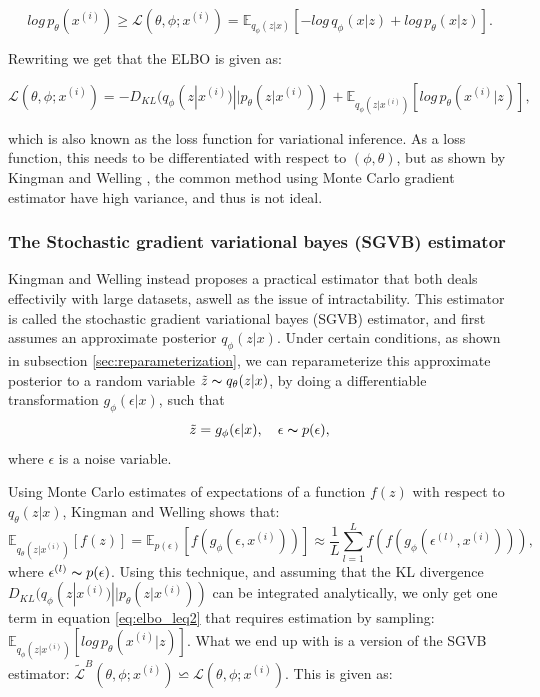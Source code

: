 \begin{equation}\label{eq:elbo_leq1}
    log\, p_{\theta}(x^{(i)}) \geq \mathcal{L}(\theta, \phi;x^{(i)}) = \mathbb{E}_{q_{\phi}(z|x)}[-log\, q_{\phi}(x|z)+log\, p_{\theta}(x|z)].
\end{equation}

Rewriting we get that the ELBO is given as:

\begin{equation}\label{eq:elbo_leq2}
    \mathcal{L}(\theta, \phi;x^{(i)}) =  - D_{KL}(q_{\phi}(z|x^{(i)})||p_{\theta}(z|x^{(i)})) + \mathbb{E}_{q_{\phi}(z|x^{(i)})}[log\, p_{\theta}(x^{(i)}|z)],
\end{equation}

which is also known as the loss function for variational inference. As a loss function, this needs to be differentiated with respect to 
$(\phi, \theta)$, but as shown by Kingman and Welling \cite{VAE}, the common method using Monte Carlo gradient estimator have high variance,
and thus is not ideal. 

\subsubsection*{The Stochastic gradient variational bayes (SGVB) estimator}
Kingman and Welling \cite{VAE} instead proposes a practical estimator that both deals effectivily with large datasets, aswell as the 
issue of intractability. This estimator is called the stochastic gradient variational bayes (SGVB) estimator, and first assumes an approximate 
posterior $q_{\phi}(z|x)$. Under certain conditions, as shown in subsection \ref{sec:reparameterization}, we can reparameterize this approximate
posterior to a random variable $\tilde{z} \thicksim q_{\theta}(z|x)$, by doing a differentiable transformation $g_{\phi}(\epsilon|x)$, such that 
\begin{equation*}
    \tilde{z} = g_{\phi}(\epsilon|x), \quad \epsilon \thicksim p(\epsilon),
\end{equation*}
where $\epsilon$ is a noise variable.\par 
Using Monte Carlo estimates of expectations of a function $f(z)$ with respect to $q_{\theta}(z|x)$, Kingman and Welling \cite{VAE} shows that:
\begin{equation}
    \mathbb{E}_{q_{\theta}(z|x^{(i)})}[f(z)] = \mathbb{E}_{p(\epsilon)}[f(g_{\phi}(\epsilon, x^{(i)}))] \approx \frac{1}{L}\sum_{l=1}^{L}f(f(g_{\phi}(\epsilon^{(l)}, x^{(i)}))),
\end{equation}
where $\epsilon^{(l)} \thicksim p(\epsilon)$. Using this technique, and assuming that the KL divergence 
$D_{KL}(q_{\phi}(z|x^{(i)})||p_{\theta}(z|x^{(i)}))$ can be integrated analytically, we only get one term in 
equation \ref{eq:elbo_leq2} that requires estimation by sampling: $\mathbb{E}_{q_{\phi}(z|x^{(i)})}[log\, p_{\theta}(x^{(i)}|z)]$. 
What we end up with is a version of the SGVB estimator: $\tilde{\mathcal{L}}^{B}(\theta, \phi; x^{(i)}) \backsimeq 
\mathcal{L}(\theta, \phi; x^{(i)})$. This is given as:

